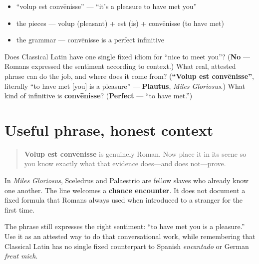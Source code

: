 \begin{itemize}
\raggedright
  \item \textquotedblleft{}volup est convēnisse\textquotedblright{} — \textquotedblleft{}it's a pleasure to have met you\textquotedblright{}
  \item the pieces — volup (pleasant) + est (is) + convēnisse (to have met)
  \item the grammar — convēnisse is a perfect infinitive
\end{itemize}

\begin{tcolorbox}[breakable,colback=teal!4,colframe=teal!35!black,title={Before you move on}]
Does Classical Latin have one single fixed idiom for \textquotedblleft{}nice to meet you\textquotedblright{}? (\textbf{No} — Romans expressed the sentiment according to context.) What real, attested phrase can do the job, and where does it come from? (\textbf{\textquotedblleft{}Volup est convēnisse\textquotedblright{}}, literally \textquotedblleft{}to have met {[}you{]} is a pleasure\textquotedblright{} — \textbf{Plautus}, \emph{Miles Gloriosus}.) What kind of infinitive is \textbf{convēnisse}? (\textbf{Perfect} — \textquotedblleft{}to have met.\textquotedblright{})
\end{tcolorbox}
\section[tē volup est convēnisse]{Useful phrase, honest context}

\label{lesson:LA-C21-meeting-phrase-context}



\begin{quote}
\textbf{Volup est convēnisse} is genuinely Roman. Now place it in its scene so you know exactly what that evidence does—and does not—prove.
\end{quote}

\begin{culture}
In \emph{Miles Gloriosus}, Sceledrus and Palaestrio are fellow slaves who already know one another. The line welcomes a \textbf{chance encounter}. It does not document a fixed formula that Romans always used when introduced to a stranger for the first time.

The phrase still expresses the right sentiment: \textquotedblleft{}to have met you is a pleasure.\textquotedblright{} Use it as an attested way to do that conversational work, while remembering that Classical Latin has no single fixed counterpart to Spanish \emph{encantado} or German \emph{freut mich}.
\end{culture}

